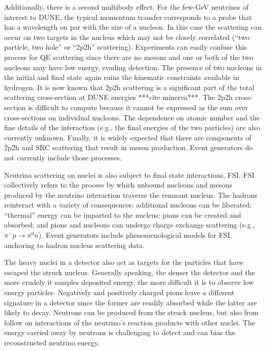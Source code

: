 Additionally, there is a second multibody effect. For the few-GeV neutrinos of interest to DUNE, the typical momentum transfer corresponds to a probe that has a wavelength on par with the size of a nucleon. In this case the scattering can occur on two targets in the nucleus which may not be closely correlated (``two particle, two hole'' or ``2p2h'' scattering). Experiments can easily confuse this process for QE scattering since there are no mesons and one or both of the two nucleons may have low energy, evading detection. The presence of two nucleons in the initial and final state again ruins the kinematic constraints available in hydrogen. It is now known that 2p2h scattering is a significant part of the total scattering cross-section at DUNE energies ***cite minerva***. The 2p2h cross-section is difficult to compute because it cannot be expressed as the sum over cross-sections on individual nucleons. The dependence on atomic number and the fine details of the interaction (e.g., the final energies of the two particles) are also currently unknown. Finally, it is widely expected that there are components of 2p2h and SRC scattering that result in meson production. Event generators do not currently include those processes.


Neutrino scattering on nuclei is also subject to final state interactions, FSI. FSI collectively refers to the process by which unbound nucleons and mesons produced by the neutrino interaction traverse the remnant nucleus. The hadrons reinteract with a variety of consequences: additional nucleons can be liberated; ``thermal'' energy can be imparted to the nucleus; pions can be created and absorbed; and pions and nucleons can undergo charge exchange scattering (e.g., $\pi^- p \to \pi^0 n$).  Event generators include phenomenological models for FSI, anchoring to hadron nucleus scattering data.



The heavy nuclei in a detector also act as targets for the particles that have escaped the struck nucleus. Generally speaking, the denser the detector and the more crudely it samples deposited energy, the more difficult it is to observe low energy particles. Negatively and positively charged pions leave a different signature in a detector since the former are readily absorbed while the latter are likely to decay.  Neutrons can be produced from the struck nucleus, but also from follow on interactions of the neutrino's reaction products with other nuclei. The energy carried away by neutrons is challenging to detect and can bias the reconstructed neutrino energy. 


